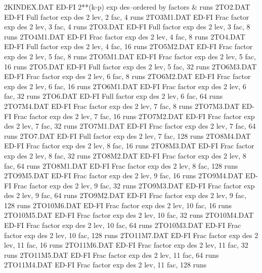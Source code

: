 2KINDEX.DAT                 ED-FI 2**(k-p) exp des--ordered by factors & runs
2TO2.DAT                    ED-FI Full factor exp des 2 lev,  2 fac,   4 runs
2TO3M1.DAT                  ED-FI Frac factor exp des 2 lev,  3 fac,   4 runs
2TO3.DAT                    ED-FI Full factor exp des 2 lev,  3 fac,   8 runs
2TO4M1.DAT                  ED-FI Frac factor exp des 2 lev,  4 fac,   8 runs
2TO4.DAT                    ED-FI Full factor exp des 2 lev,  4 fac,  16 runs
2TO5M2.DAT                  ED-FI Frac factor exp des 2 lev,  5 fac,   8 runs
2TO5M1.DAT                  ED-FI Frac factor exp des 2 lev,  5 fac,  16 runs
2TO5.DAT                    ED-FI Full factor exp des 2 lev,  5 fac,  32 runs
2TO6M3.DAT                  ED-FI Frac factor exp des 2 lev,  6 fac,   8 runs
2TO6M2.DAT                  ED-FI Frac factor exp des 2 lev,  6 fac,  16 runs
2TO6M1.DAT                  ED-FI Frac factor exp des 2 lev,  6 fac,  32 runs
2TO6.DAT                    ED-FI Full factor exp des 2 lev,  6 fac,  64 runs
2TO7M4.DAT                  ED-FI Frac factor exp des 2 lev,  7 fac,   8 runs
2TO7M3.DAT                  ED-FI Frac factor exp des 2 lev,  7 fac,  16 runs
2TO7M2.DAT                  ED-FI Frac factor exp des 2 lev,  7 fac,  32 runs
2TO7M1.DAT                  ED-FI Frac factor exp des 2 lev,  7 fac,  64 runs
2TO7.DAT                    ED-FI Full factor exp des 2 lev,  7 fac, 128 runs
2TO8M4.DAT                  ED-FI Frac factor exp des 2 lev,  8 fac,  16 runs
2TO8M3.DAT                  ED-FI Frac factor exp des 2 lev,  8 fac,  32 runs
2TO8M2.DAT                  ED-FI Frac factor exp des 2 lev,  8 fac,  64 runs
2TO8M1.DAT                  ED-FI Frac factor exp des 2 lev,  8 fac, 128 runs
2TO9M5.DAT                  ED-FI Frac factor exp des 2 lev,  9 fac,  16 runs
2TO9M4.DAT                  ED-FI Frac factor exp des 2 lev,  9 fac,  32 runs
2TO9M3.DAT                  ED-FI Frac factor exp des 2 lev,  9 fac,  64 runs
2TO9M2.DAT                  ED-FI Frac factor exp des 2 lev,  9 fac, 128 runs
2TO10M6.DAT                 ED-FI Frac factor exp des 2 lev, 10 fac,  16 runs
2TO10M5.DAT                 ED-FI Frac factor exp des 2 lev, 10 fac,  32 runs
2TO10M4.DAT                 ED-FI Frac factor exp des 2 lev, 10 fac,  64 runs
2TO10M3.DAT                 ED-FI Frac factor exp des 2 lev, 10 fac, 128 runs
2TO11M7.DAT                 ED-FI Frac factor exp des 2 lev, 11 fac,  16 runs
2TO11M6.DAT                 ED-FI Frac factor exp des 2 lev, 11 fac,  32 runs
2TO11M5.DAT                 ED-FI Frac factor exp des 2 lev, 11 fac,  64 runs
2TO11M4.DAT                 ED-FI Frac factor exp des 2 lev, 11 fac, 128 runs
